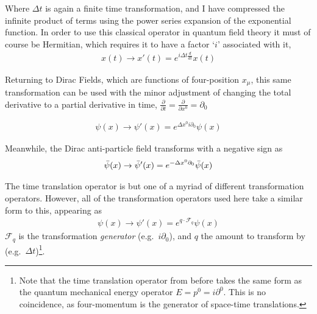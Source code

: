    Where $\Delta t$ is again a finite time transformation,
        and I have compressed the infinite product of terms using the power series expansion of the exponential function.
    In order to use this classical operator in quantum field theory it must of course be Hermitian,
        which requires it to have a factor `$i$' associated with it,
    \begin{equation} \begin{split}
    x(t) \to x'(t) = e^{i\Delta t \frac{d}{dt}} x(t)
    \end{split} \end{equation}

    Returning to Dirac Fields, which are functions of four-position $x_\mu$, this same transformation can be used
         with the minor adjustment of changing the total derivative to a partial derivative in time,
         $\frac{\partial}{\partial t} = \frac{\partial}{\partial x^0} = \partial_0$

    \begin{equation} \begin{split}
    \psi(x) \to \psi'(x) = e^{\Delta x^0 i\partial_0} \psi(x)
    \end{split} \end{equation}

    Meanwhile, the Dirac anti-particle field transforms with a negative sign as
    \begin{equation} \begin{split}
        \bar{\psi}(x) \to \bar{\psi}'(x) = e^{-\Delta x^0 \partial_0} \bar{\psi}(x)
    \end{split} \end{equation}
    
    The time translation operator is but one of a myriad of different transformation operators.
    However, all of the transformation operators used here take a similar form to this, appearing as
    \begin{equation} \begin{split}
        \psi(x) \to \psi'(x) = e^{ q \cdot \mathcal{F}_q } \psi(x)
    \end{split} \end{equation}
    $\mathcal{F}_q$ is the transformation \textit{generator} (e.g.\ $i\partial_0$),
        and $q$ the amount to transform by (e.g.\ $\Delta t$)\footnote{
            Note that the time translation operator from before takes the same form as the quantum mechanical energy operator
                $E = p^0 = i\partial^0$.
            This is no coincidence, as four-momentum is the generator of space-time translations.
         }.

